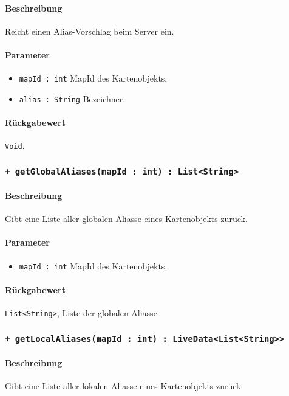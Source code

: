 \paragraph*{Beschreibung}
Reicht einen Alias-Vorschlag beim Server ein.
\paragraph*{Parameter}
\begin{itemize}
    \item \texttt{mapId : int} MapId des Kartenobjekts.
    \item \texttt{alias : String} Bezeichner.
\end{itemize}
\paragraph*{Rückgabewert}
\texttt{Void}.

\subsubsection*{\texttt{+ getGlobalAliases(mapId : int) : List<String>}}\label{App_AddAlias_IAliasDataProvider_getGlobalAliases}%
\paragraph*{Beschreibung}
Gibt eine Liste aller globalen Aliasse eines Kartenobjekts zurück.
\paragraph*{Parameter}
\begin{itemize}
    \item \texttt{mapId : int} MapId des Kartenobjekts.
\end{itemize}
\paragraph*{Rückgabewert}
\texttt{List<String>}, Liste der globalen Aliasse.

\subsubsection*{\texttt{+ getLocalAliases(mapId : int) : LiveData<List<String>>}}\label{App_AddAlias_IAliasDataProvider_getLocalAliases}%
\paragraph*{Beschreibung}
Gibt eine Liste aller lokalen Aliasse eines Kartenobjekts zurück.
